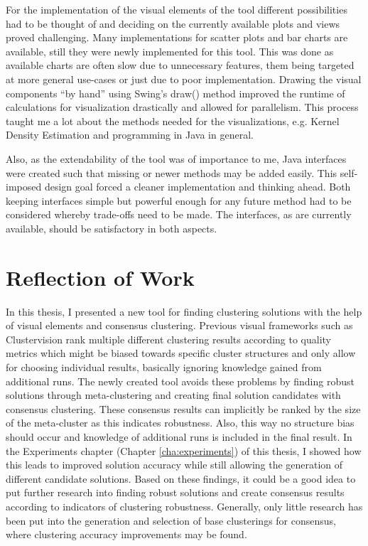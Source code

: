 \documentclass[
	a4paper,
	english,
	twoside,
	openright,               
	11pt                            
	]{report}
\begin{document}
For the implementation of the visual elements of the tool different possibilities had to be thought of and deciding on the currently available plots and views proved challenging. Many implementations for scatter plots and bar charts are available, still they were newly implemented for this tool. This was done as available charts are often slow due to unnecessary features, them being targeted at more general use-cases or just due to poor implementation. Drawing the visual components ``by hand'' using Swing's \cite{javaswing} draw() method improved the runtime of calculations for visualization drastically and allowed for parallelism. This process taught me a lot about the methods needed for the visualizations, e.g. Kernel Density Estimation and programming in Java in general. 

Also, as the extendability of the tool was of importance to me, Java interfaces were created such that missing or newer methods may be added easily. This self-imposed design goal forced a cleaner implementation and thinking ahead. Both keeping interfaces simple but powerful enough for any future method had to be considered whereby trade-offs need to be made. The interfaces, as are currently available, should be satisfactory in both aspects.

\section{Reflection of Work}
In this thesis, I presented a new tool for finding clustering solutions with the help of visual elements and consensus clustering. Previous visual frameworks such as Clustervision \cite{Kwon2018ClustervisionVS} rank multiple different clustering results according to quality metrics which might be biased towards specific cluster structures and only allow for choosing individual results, basically ignoring knowledge gained from additional runs. The newly created tool avoids these problems by finding robust solutions through meta-clustering and creating final solution candidates with consensus clustering. These consensus results can implicitly be ranked by the size of the meta-cluster as this indicates robustness. Also, this way no structure bias should occur and knowledge of additional runs is included in the final result. In the Experiments chapter (Chapter \ref{cha:experiments}) of this thesis, I showed how this leads to improved solution accuracy while still allowing the generation of different candidate solutions. Based on these findings, it could be a good idea to put further research into finding robust solutions and create consensus results according to indicators of clustering robustness. Generally, only little research has been put into the generation and selection of base clusterings for consensus, where clustering accuracy improvements may be found.
\end{document}
